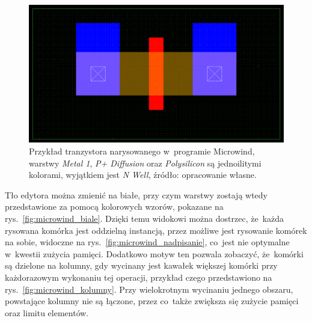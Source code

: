 \begin{figure}[h]
    \centering
    \includegraphics[width=.9\textwidth]{chapters/chapter2/img/microwind_tran}
    \caption[Przykład tranzystora narysowanego w~programie Microwind.]
    {
        Przykład tranzystora narysowanego w~programie Microwind,
        warstwy \textit{Metal 1}, \textit{P+ Diffusion} oraz \textit{Polysilicon} są jednoilitymi kolorami,
        wyjątkiem jest \textit{N Well},
        źródło: opracowanie własne.
    }
    \label{fig:microwind_tran}
\end{figure}

Tło edytora można zmienić na białe, przy czym warstwy zostają wtedy przedstawione za pomocą kolorowych wzorów,
pokazane na rys.~\ref{fig:microwind_biale}.
Dzięki temu widokowi można dostrzec, że~każda rysowana komórka jest oddzielną instancją,
przez możliwe jest rysowanie komórek na sobie,
widoczne na rys.~\ref{fig:microwind_nadpisanie}, co~jest nie optymalne w~kwestii zużycia pamięci.
Dodatkowo motyw ten pozwala zobaczyć, że~komórki są dzielone na kolumny,
gdy wycinany jest kawałek większej komórki przy każdorazowym wykonaniu tej operacji,
przykład czego przedstawiono na rys.~\ref{fig:microwind_kolumny}.
Przy wielokrotnym wycinaniu jednego obszaru,
powstające kolumny nie są łączone,
przez co~także zwiększa się zużycie pamięci oraz limitu elementów.

